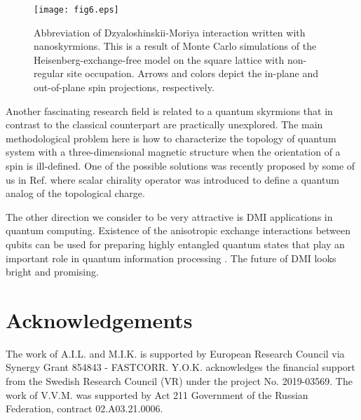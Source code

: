\documentclass[aps,prl,twocolumn,showpacs,amsmath,amssymb]{revtex4-1}
\begin{document}
\begin{figure}[!h]
\texttt{[image: fig6.eps]}
\caption{Abbreviation of Dzyaloshinskii-Moriya interaction written with nanoskyrmions. This is a result of Monte Carlo simulations of the Heisenberg-exchange-free model on the square lattice with non-regular site occupation. Arrows and colors depict the in-plane and out-of-plane spin projections, respectively.}
\label{nanoskyrmion}
\end{figure}

Another fascinating research field is related to a quantum skyrmions that in contrast to the classical counterpart are practically unexplored. The main methodological problem here is how to characterize the topology of quantum system with a three-dimensional magnetic structure when the orientation of a spin is ill-defined. One of the possible solutions was recently proposed by some of us in Ref.\cite{quantumskyrmion} where scalar chirality operator was introduced to define a quantum analog of the topological charge.

The other direction we consider to be very attractive is DMI applications in quantum computing. Existence of the anisotropic exchange interactions between qubits can be used for preparing highly entangled quantum states that play an important role in quantum information processing \cite{Grover, Shor}. 
The future of DMI looks bright and promising.

\section{Acknowledgements}
The work of A.I.L. and  M.I.K. is supported by European Research Council via Synergy Grant 854843 - FASTCORR.
Y.O.K. acknowledges the financial support from the Swedish Research Council (VR) under the project No. 2019-03569.
The work of V.V.M. was supported by Act 211 Government of the Russian Federation, contract 02.A03.21.0006.
\end{document}
